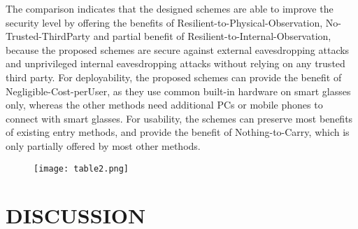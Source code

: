 \documentclass[12pt,a4paper,oneside]{report}
\begin{document}
\par
The comparison indicates that the designed schemes are
able to improve the security level by offering the benefits of Resilient-to-Physical-Observation, No-Trusted-ThirdParty and partial benefit of Resilient-to-Internal-Observation,
because the proposed schemes are secure against external eavesdropping attacks and unprivileged internal eavesdropping attacks
without relying on any trusted third party. For deployability,
the proposed  schemes can provide the benefit of Negligible-Cost-perUser, as they use common built-in hardware on smart glasses
only, whereas the other methods need additional PCs or
mobile phones to connect with smart glasses. For usability, the
schemes can preserve most benefits of existing entry methods,
and provide the benefit of Nothing-to-Carry, which is only
partially offered by most other methods.

\begin{figure}[H]
    \begin{center}
        \label{abc}
            \texttt{[image: table2.png]}
    \end{center}
\end{figure}



\chapter{DISCUSSION}
\end{document}
